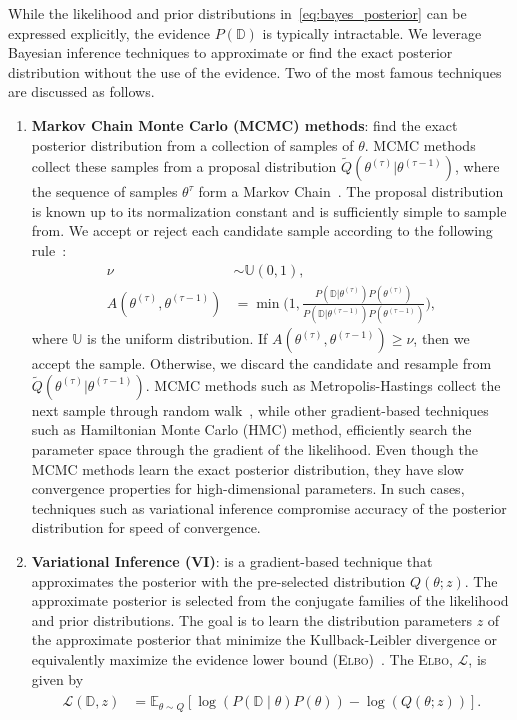 While the likelihood and prior distributions in~\eqref{eq:bayes_posterior} can
be expressed explicitly, the evidence $P(\mathbb{D})$ is typically intractable.
We leverage Bayesian inference techniques to approximate or find the exact
posterior distribution without the use of the evidence. Two of the most famous
techniques are discussed as follows.
\begin{enumerate}
  \item \textbf{Markov Chain Monte Carlo (MCMC) methods}: find the exact
  posterior distribution from a collection of samples of $\theta$.
  MCMC methods collect these samples from a proposal distribution
  $\tilde{Q}(\theta^{(\tau)} | \theta^{(\tau-1)})$, where the sequence of
  samples $\theta^\tau$ form a Markov Chain~\cite{bishop2006pattern}.
  The proposal distribution is known up to its normalization constant and is
  sufficiently simple to sample from. 
  We accept or reject each candidate sample according to the following rule~\cite{bishop2006pattern}:
  \begin{align*}
    \nu &\sim \mathbb{U}(0, 1), \\
    A(\theta^{(\tau)}, \theta^{(\tau-1)}) &= \min \Biggl(1, \frac{P(\mathbb{D} | \theta^{(\tau)})P(\theta^{(\tau)})}{P(\mathbb{D} | \theta^{(\tau-1)})P(\theta^{(\tau-1)})} \Biggr),
  \end{align*}
  \noindent where $\mathbb{U}$ is the uniform distribution. If
  $A(\theta^{(\tau)}, \theta^{(\tau-1)}) \geq \nu$, then we accept the sample. 
  Otherwise, we discard the candidate and resample from $\tilde{Q}(\theta^{(\tau)} |
  \theta^{(\tau-1)})$.
  MCMC methods such as Metropolis-Hastings collect the next sample through
  random walk~\cite{gilks1995markov}, while other gradient-based techniques such
  as Hamiltonian Monte Carlo (HMC) method, efficiently search the
  parameter space through the gradient of the likelihood.
  Even though the MCMC methods learn the exact posterior distribution, they have
  slow convergence properties for high-dimensional parameters. In such cases,
  techniques such as variational inference compromise accuracy of the posterior
  distribution for speed of convergence.
  
\item \textbf{Variational Inference (VI)}: is a gradient-based technique that approximates the posterior with the pre-selected
distribution $Q(\theta;z)$.
%
The approximate posterior is selected from the conjugate families of the
likelihood and prior distributions. The goal is to learn the distribution
parameters $z$ of the approximate posterior that minimize the Kullback-Leibler
divergence or equivalently maximize the evidence lower bound
(\textsc{Elbo})~\cite{cohen2016bayesian}. The \textsc{Elbo}, $\mathcal{L}$, is
given by
\begin{align}
  \begin{split}
  \mathcal{L}(\mathbb{D},z) &= \mathbb{E}_{\theta \sim Q} \left[\log(P(\mathbb{D} \mid \theta)P(\theta)) - \log(Q(\theta;z)) \right].
  \end{split}
  \label{eq:elbo}
\end{align}
\end{enumerate}

